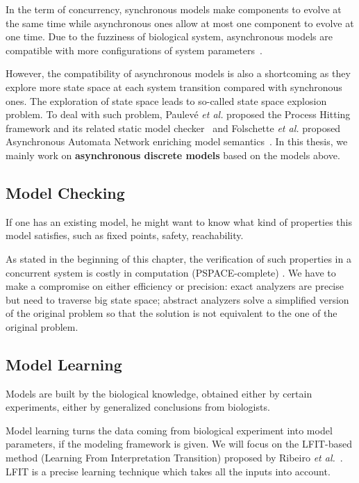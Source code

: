 In the term of concurrency, synchronous models make components to evolve at the same time while asynchronous ones allow at most one component to evolve at one time.
Due to the fuzziness of biological system, asynchronous models are compatible with more configurations of system parameters~\cite{bernot2009}.

However, the compatibility of asynchronous models is also a shortcoming as they explore more state space at each system transition compared with synchronous ones.
The exploration of state space leads to so-called state space explosion problem.
To deal with such problem, Paulev\'e \textit{et al.} proposed the Process Hitting framework and its related static model checker~\cite{pauleve2012} and Folschette \textit{et al.} proposed Asynchronous Automata Network enriching model semantics~\cite{folschette2015}.
In this thesis, we mainly work on \textbf{asynchronous discrete models} based on the models above.

\subsection{Model Checking}
If one has an existing model, he might want to know what kind of properties this model satisfies, such as fixed points, safety, reachability.

As stated in the beginning of this chapter, the verification of such properties in a concurrent system is costly in computation (PSPACE-complete) \cite{harel2002complexity}.
We have to make a compromise on either efficiency or precision: exact analyzers are precise but need to traverse big state space; abstract analyzers solve a simplified version of the original problem so that the solution is not equivalent to the one %
 of the original problem.

\subsection{Model Learning}
Models are built by the biological knowledge, obtained either by certain experiments, either by generalized conclusions from biologists.

Model learning turns the data coming from biological experiment into model parameters, if the modeling framework is given.
We will focus on the LFIT-based method (Learning From Interpretation Transition) proposed by Ribeiro \textit{et al.}~\cite{ribeiro2015learning,ribeiro2018learning,ribeiro2017inductive}.
LFIT is a precise learning technique which takes all the inputs into account.

